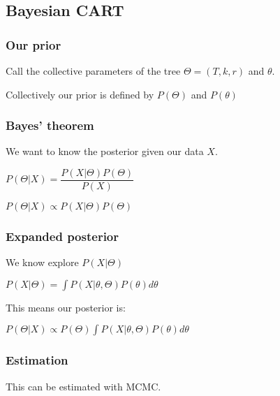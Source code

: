 
\subsection{Bayesian CART}

\subsubsection{Our prior}

Call the collective parameters of the tree \(\Theta =(T, k, r)\) and \(\theta \).

Collectively our prior is defined by \(P(\Theta )\) and \(P(\theta )\)

\subsubsection{Bayes' theorem}

We want to know the posterior given our data \(X\).

\(P(\Theta | X)=\dfrac{P(X|\Theta )P(\Theta )}{P(X)}\)

\(P(\Theta | X)\propto P(X|\Theta )P(\Theta )\)

\subsubsection{Expanded posterior}

We know explore \(P(X|\Theta )\)

\(P(X|\Theta )=\int P(X| \theta , \Theta)P(\theta)d\theta \)

This means our posterior is:

\(P(\Theta | X)\propto P(\Theta )\int P(X| \theta , \Theta)P(\theta)d\theta \)

\subsubsection{Estimation}

This can be estimated with MCMC.

